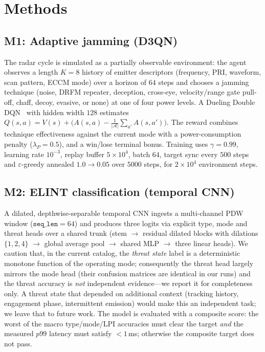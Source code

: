\documentclass[journal]{IEEEtran}
\begin{document}
\section{Methods}
\label{sec:methods}

\subsection{M1: Adaptive jamming (D3QN)}
The radar cycle is simulated as a partially observable environment: the agent observes a length
$K{=}8$ history of emitter descriptors (frequency, PRI, waveform, scan pattern, ECCM mode) over
a horizon of $64$ steps and chooses a jamming technique (noise, DRFM repeater, deception,
cross-eye, velocity/range gate pull-off, chaff, decoy, evasive, or none) at one of four power
levels. A Dueling Double DQN~\cite{wang2016dueling,vanhasselt2016double} with hidden width $128$
estimates $Q(s,a)=V(s)+\big(A(s,a)-\tfrac{1}{|\mathcal{A}|}\sum_{a'}A(s,a')\big)$. The reward
combines technique effectiveness against the current mode with a power-consumption penalty
($\lambda_P{=}0.5$), and a win/lose terminal bonus. Training uses $\gamma{=}0.99$, learning
rate $10^{-3}$, replay buffer $5 \times 10^{4}$, batch $64$, target sync every $500$ steps and
$\varepsilon$-greedy annealed $1.0 \to 0.05$ over $5000$ steps, for $2 \times 10^{4}$
environment steps.

\subsection{M2: ELINT classification (temporal CNN)}
A dilated, depthwise-separable temporal CNN ingests a multi-channel PDW window
($\texttt{seq\_len}{=}64$) and produces three logits via explicit type, mode and threat heads
over a shared trunk (stem $\to$ residual dilated blocks with dilations $\{1,2,4\}$ $\to$
global average pool $\to$ shared MLP $\to$ three linear heads). We caution that, in the current
catalog, the \emph{threat state} label is a deterministic monotone function of the operating
mode; consequently the threat head largely mirrors the mode head (their confusion matrices are
identical in our runs) and the threat accuracy is \emph{not} independent evidence---we report it
for completeness only. A threat state that depended on additional context (tracking history,
engagement phase, intermittent emission) would make this an independent task; we leave that to
future work. The model is evaluated with a composite score: the worst of the macro type/mode/LPI
accuracies must clear the target \emph{and} the measured $p99$ latency must satisfy $<1$\,ms;
otherwise the composite target does not pass.
\end{document}
